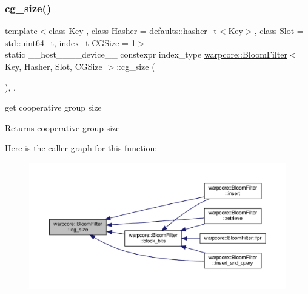 \subsubsection{\texorpdfstring{cg\+\_\+size()}{cg\_size()}}
{\footnotesize\ttfamily template$<$class Key , class Hasher  = defaults\+::hasher\+\_\+t$<$\+Key$>$, class Slot  = std\+::uint64\+\_\+t, index\+\_\+t C\+G\+Size = 1$>$ \\
static \+\_\+\+\_\+host\+\_\+\+\_\+\+\_\+\+\_\+device\+\_\+\+\_\+ constexpr index\+\_\+type \hyperlink{classwarpcore_1_1BloomFilter}{warpcore\+::\+Bloom\+Filter}$<$ Key, Hasher, Slot, C\+G\+Size $>$\+::cg\+\_\+size (\begin{DoxyParamCaption}{ }\end{DoxyParamCaption})\hspace{0.3cm}{\ttfamily [inline]}, {\ttfamily [static]}, {\ttfamily [noexcept]}}



get cooperative group size 

\begin{DoxyReturn}{Returns}
cooperative group size 
\end{DoxyReturn}
Here is the caller graph for this function\+:
\nopagebreak
\begin{figure}[H]
\begin{center}
\leavevmode
\includegraphics[width=350pt]{classwarpcore_1_1BloomFilter_a6ad2335811852ad62fc65e85416d3904_icgraph}
\end{center}
\end{figure}
\mbox{\label{classwarpcore_1_1BloomFilter_a27b98847aa06d277c48068ff59ca9381}} 
